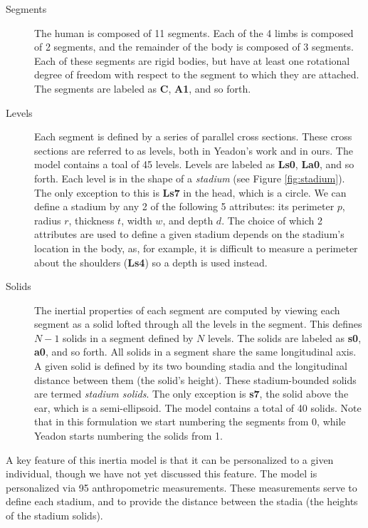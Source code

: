 \documentclass[10pt]{article}
\begin{document}
\begin{description}
    \item[Segments]
        The human is composed of 11 segments. Each of the 4 limbs is
        composed of 2 segments, and the remainder of the body is composed of 3
        segments. Each of these segments are rigid bodies, but have at least
        one rotational degree of freedom with respect to the segment to which
        they are attached.  The segments are labeled as \textbf{C},
        \textbf{A1}, and so forth.
    \item[Levels]
        Each segment is defined by a series of parallel cross sections.
        These cross sections are referred to as levels, both in
        Yeadon's work and in ours. The model contains a toal of 45 levels.
        Levels are labeled as \textbf{Ls0}, \textbf{La0}, and so forth.  Each
        level is in the shape of a \emph{stadium} (see Figure
        \ref{fig:stadium}). The only exception to this is \textbf{Ls7} in the
        head, which is a circle. We can define a stadium by any 2 of the
        following 5 attributes: its perimeter $p$, radius $r$, thickness $t$,
        width $w$, and depth $d$.  The choice of which 2 attributes are used to
        define a given stadium depends on the stadium's location in the body,
        as, for example, it is difficult to measure a perimeter about the
        shoulders (\textbf{Ls4}) so a depth is used instead.
    \item[Solids]
        The inertial properties of each segment are computed by viewing each
        segment as a solid lofted through all the levels in the segment. This
        defines $N-1$ solids in a segment defined by $N$ levels. The solids are
        labeled as \textbf{s0}, \textbf{a0}, and so forth. All solids in a
        segment share the same longitudinal axis. A given solid is
        defined by its two bounding stadia and the longitudinal distance
        between them (the solid's height). These stadium-bounded solids are
        termed \emph{stadium solids}. The only exception is \textbf{s7}, the
        solid above the ear, which is a semi-ellipsoid. The model contains a
        total of 40 solids.  Note that in this formulation we start numbering
        the segments from 0, while Yeadon starts numbering the solids from 1.
\end{description}

A key feature of this inertia model is that it can be personalized to a given
individual, though we have not yet discussed this feature. The model is
personalized via 95 anthropometric measurements. These measurements serve to
define each stadium, and to provide the distance between the stadia (the
heights of the stadium solids).
\end{document}
